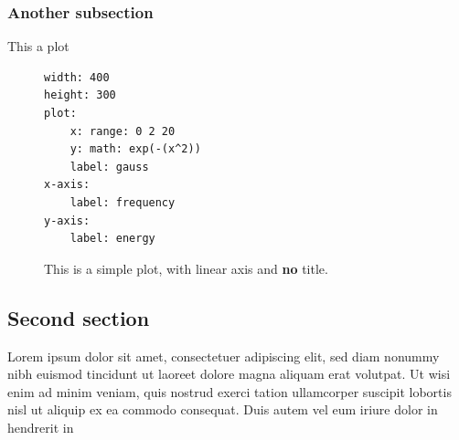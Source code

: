 \documentclass[a4paper,10pt]{article}
\begin{document}
\subsubsection{Another subsection}

This a plot

\begin{figure}

\begin{lstlisting}
width: 400
height: 300
plot:
    x: range: 0 2 20
    y: math: exp(-(x^2))
    label: gauss
x-axis:
    label: frequency
y-axis:
    label: energy
\end{lstlisting}

\caption{This is a simple plot, with linear axis and \textbf{no} title.}
\label{fig:plot}
\end{figure}

\subsection{Second section}

Lorem ipsum
dolor sit amet, consectetuer adipiscing elit, sed diam nonummy nibh euismod tincidunt ut
laoreet dolore magna aliquam erat volutpat. Ut wisi enim ad minim veniam, quis nostrud exerci tation
ullamcorper suscipit lobortis nisl ut aliquip ex ea commodo consequat. Duis autem vel eum iriure dolor in hendrerit in
\end{document}
